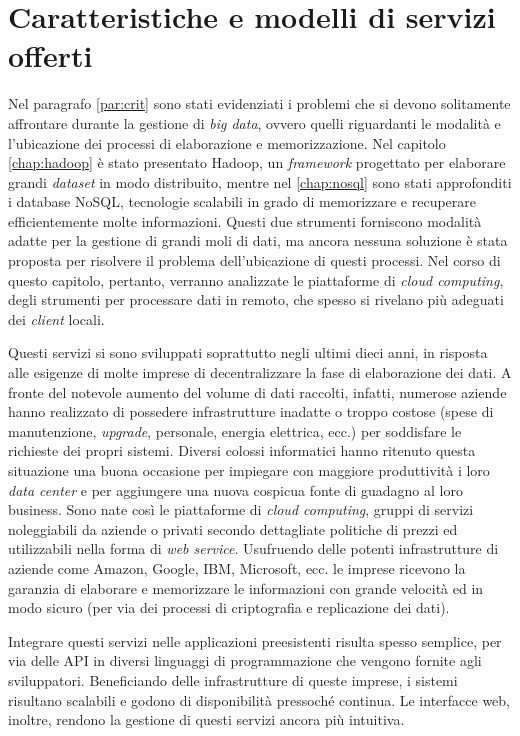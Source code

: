 \section{Caratteristiche e modelli di servizi offerti}

Nel paragrafo \ref{par:crit} sono stati evidenziati i problemi che si devono solitamente affrontare durante la gestione di \textit{big data}, ovvero quelli riguardanti le modalità e l’ubicazione dei 
processi di elaborazione e memorizzazione. Nel capitolo \ref{chap:hadoop} è stato presentato Hadoop, un \textit{framework} progettato per elaborare grandi \textit{dataset} in modo distribuito, mentre nel 
\ref{chap:nosql} sono stati approfonditi i database NoSQL, tecnologie scalabili in grado di memorizzare e recuperare efficientemente molte informazioni. Questi due strumenti forniscono 
modalità adatte per la gestione di grandi moli di dati, ma ancora nessuna soluzione è stata proposta per risolvere il problema dell’ubicazione di questi processi. Nel corso di 
questo capitolo, pertanto, verranno analizzate le piattaforme di \textit{cloud computing}, degli strumenti per processare dati in remoto, che spesso si rivelano più adeguati dei \textit{client} locali.

Questi servizi si sono sviluppati soprattutto negli ultimi dieci anni, in risposta alle esigenze di molte imprese di decentralizzare la fase di elaborazione dei dati. A fronte del 
notevole aumento del volume di dati raccolti, infatti, numerose aziende hanno realizzato di possedere infrastrutture inadatte o troppo costose (spese di manutenzione, \textit{upgrade}, personale, 
energia elettrica, ecc.) per soddisfare le richieste dei propri sistemi. Diversi colossi informatici hanno ritenuto questa situazione una buona occasione per impiegare con maggiore 
produttività i loro \textit{data center} e per aggiungere una nuova cospicua fonte di guadagno al loro business. Sono nate così le piattaforme di \textit{cloud computing}, gruppi di servizi noleggiabili
da aziende o privati secondo dettagliate politiche di prezzi ed utilizzabili nella forma di \textit{web service}. Usufruendo delle potenti infrastrutture di aziende come Amazon, Google, IBM, 
Microsoft, ecc. le imprese ricevono la garanzia di elaborare e memorizzare le informazioni con grande velocità ed in modo sicuro (per via dei processi di criptografia e replicazione 
dei dati). 

Integrare questi servizi nelle applicazioni preesistenti risulta spesso semplice, per via delle API in diversi linguaggi di programmazione che vengono fornite agli sviluppatori. 
Beneficiando delle infrastrutture di queste imprese, i sistemi risultano scalabili e godono di disponibilità pressoché continua.  Le interfacce web, inoltre, rendono la gestione 
di questi servizi ancora più intuitiva.

